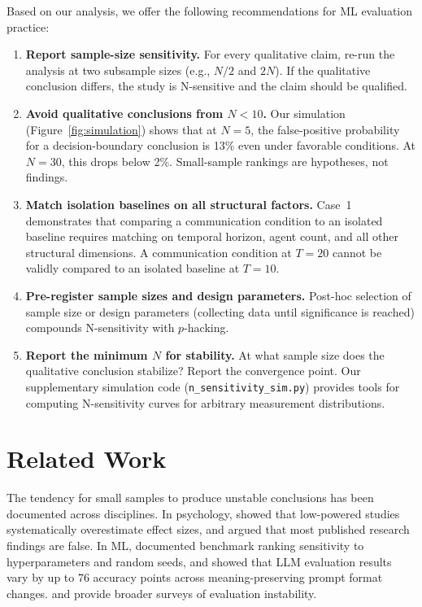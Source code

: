 \documentclass[11pt]{article}
\begin{document}
Based on our analysis, we offer the following recommendations for ML evaluation practice:

\begin{enumerate}[leftmargin=*,nosep]
    \item \textbf{Report sample-size sensitivity.} For every qualitative claim, re-run the analysis at two subsample sizes (e.g., $N/2$ and $2N$). If the qualitative conclusion differs, the study is N-sensitive and the claim should be qualified.
    \item \textbf{Avoid qualitative conclusions from $N{<}10$.} Our simulation (Figure~\ref{fig:simulation}) shows that at $N{=}5$, the false-positive probability for a decision-boundary conclusion is 13\% even under favorable conditions. At $N{=}30$, this drops below 2\%. Small-sample rankings are hypotheses, not findings.
    \item \textbf{Match isolation baselines on all structural factors.} Case~1 demonstrates that comparing a communication condition to an isolated baseline requires matching on temporal horizon, agent count, and all other structural dimensions. A communication condition at $T{=}20$ cannot be validly compared to an isolated baseline at $T{=}10$.
    \item \textbf{Pre-register sample sizes and design parameters.} Post-hoc selection of sample size or design parameters (collecting data until significance is reached) compounds N-sensitivity with $p$-hacking.
    \item \textbf{Report the minimum $N$ for stability.} At what sample size does the qualitative conclusion stabilize? Report the convergence point. Our supplementary simulation code (\texttt{n\_sensitivity\_sim.py}) provides tools for computing N-sensitivity curves for arbitrary measurement distributions.
\end{enumerate}

\section{Related Work}

The tendency for small samples to produce unstable conclusions has been documented across disciplines. In psychology, \citet{button2013power} showed that low-powered studies systematically overestimate effect sizes, and \citet{ioannidis2005most} argued that most published research findings are false. In ML, \citet{dodge2019reproducibility} documented benchmark ranking sensitivity to hyperparameters and random seeds, and \citet{sclar2024quantifying} showed that LLM evaluation results vary by up to 76 accuracy points across meaning-preserving prompt format changes. \citet{luccioni2024estimating} and \citet{liang2023holistic} provide broader surveys of evaluation instability.
\end{document}
